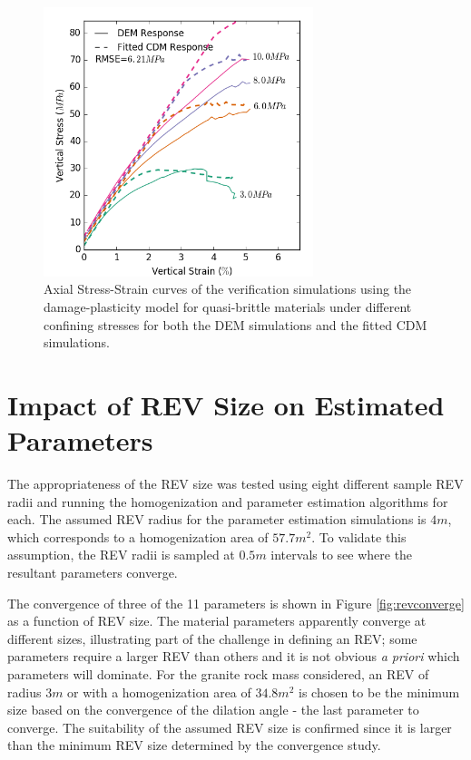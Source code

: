 \begin{figure}[!htb]
\begin{center}
\includegraphics[width=0.7\textwidth]{figures/Chapter5/ConcreteVerificationCurves}
\caption{{\label{fig:concreteverify} Axial Stress-Strain curves of the verification simulations using the damage-plasticity model for quasi-brittle materials under different confining stresses for both the DEM simulations and the fitted CDM simulations.%
}}
\end{center}
\end{figure}

\section{Impact of REV Size on Estimated Parameters}

The appropriateness of the REV size was tested using eight different sample REV radii and running the homogenization and parameter estimation algorithms for each. The assumed REV radius for the parameter estimation simulations is $4m$, which corresponds to a homogenization area of $57.7 m^2$. To validate this assumption, the REV radii is sampled at $0.5m$ intervals to see where the resultant parameters converge.

The convergence of three of the 11 parameters is shown in Figure \ref{fig:revconverge} as a function of REV size. The material parameters apparently converge at different sizes, illustrating part of the challenge in defining an REV; some parameters require a larger REV than others and it is not obvious \textit{a priori} which parameters will dominate. For the granite rock mass considered, an REV of radius $3m$ or with a homogenization area of $34.8 m^2$ is chosen to be the minimum size based on the convergence of the dilation angle - the last parameter to converge. The suitability of the assumed REV size is confirmed since it is larger than the minimum REV size determined by the convergence study.

